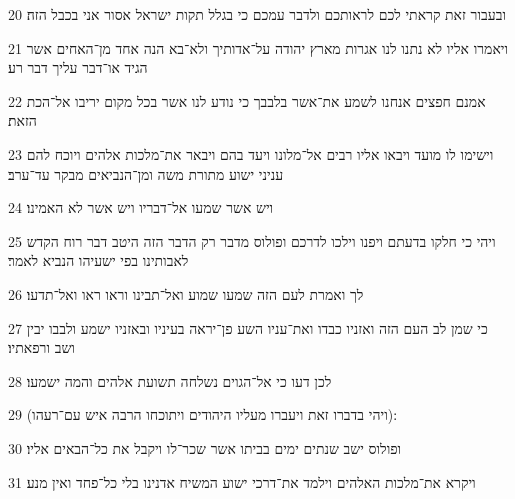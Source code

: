 \par 20 ובעבור זאת קראתי לכם לראותכם ולדבר עמכם כי בגלל תקות ישראל אסור אני בכבל הזה׃
\par 21 ויאמרו אליו לא נתנו לנו אגרות מארץ יהודה על־אדותיך ולא־בא הנה אחד מן־האחים אשר הגיד או־דבר עליך דבר רע׃
\par 22 אמנם חפצים אנחנו לשמע את־אשר בלבבך כי נודע לנו אשר בכל מקום יריבו אל־הכת הזאת׃
\par 23 וישימו לו מועד ויבאו אליו רבים אל־מלונו ויעד בהם ויבאר את־מלכות אלהים ויוכח להם עניני ישוע מתורת משה ומן־הנביאים מבקר עד־ערב׃
\par 24 ויש אשר שמעו אל־דבריו ויש אשר לא האמינו׃
\par 25 ויהי כי חלקו בדעתם ויפנו וילכו לדרכם ופולוס מדבר רק הדבר הזה היטב דבר רוח הקדש לאבותינו בפי ישעיהו הנביא לאמר׃
\par 26 לך ואמרת לעם הזה שמעו שמוע ואל־תבינו וראו ראו ואל־תדעו׃
\par 27 כי שמן לב העם הזה ואזניו כבדו ואת־עניו השע פן־יראה בעיניו ובאזניו ישמע ולבבו יבין ושב ורפאתיו׃
\par 28 לכן דעו כי אל־הגוים נשלחה תשועת אלהים והמה ישמעו׃
\par 29 (ויהי בדברו זאת ויעברו מעליו היהודים ויתוכחו הרבה איש עם־רעהו)׃
\par 30 ופולוס ישב שנתים ימים בביתו אשר שכר־לו ויקבל את כל־הבאים אליו׃
\par 31 ויקרא את־מלכות האלהים וילמד את־דרכי ישוע המשיח אדנינו בלי כל־פחד ואין מנע׃


